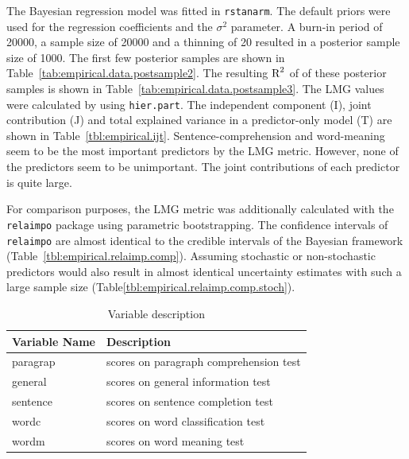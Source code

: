 \documentclass[11pt,a4paper,twoside]{book}
\begin{document}
The Bayesian regression model was fitted in \texttt{rstanarm}. The default priors were used for the regression coefficients and the $\sigma^2$ parameter. A burn-in period of 20000, a sample size of 20000 and a thinning of 20 resulted in a posterior sample size of 1000. The first few posterior samples are shown in Table~\ref{tab:empirical.data.postsample2}. The resulting $\text{R}^2$ of of these posterior samples is shown in Table~\ref{tab:empirical.data.postsample3}. The LMG values were calculated by using \texttt{hier.part}. The  independent component (I), joint contribution (J) and total explained variance in a predictor-only model (T) are shown in Table~\ref{tbl:empirical.ijt}. Sentence-comprehension and word-meaning seem to be the most important predictors by the LMG metric. However, none of the predictors seem to be unimportant.  The joint contributions of each predictor is quite large.

For comparison purposes, the LMG metric was additionally calculated with the \texttt{relaimpo} package using parametric bootstrapping. The confidence intervals of  \texttt{relaimpo} are almost identical to the credible intervals of the Bayesian framework (Table~\ref{tbl:empirical.relaimp.comp}). Assuming stochastic or non-stochastic predictors would also result in almost identical uncertainty estimates with such a large sample size (Table\ref{tbl:empirical.relaimp.comp.stoch}). 







\begin{table}
\centering
\caption{Variable description}
\begin{tabular}{l l}
  \toprule			
  Variable Name & Description  \\   \midrule  
  paragrap & scores on paragraph comprehension test  \\
  general & scores on general information test \\
  sentence & scores on sentence completion test\\
  wordc & scores on word classification test \\
  wordm & scores on word meaning test \\
  \bottomrule  
\end{tabular}
\label{table:hs.data}
\end{table}
\end{document}
